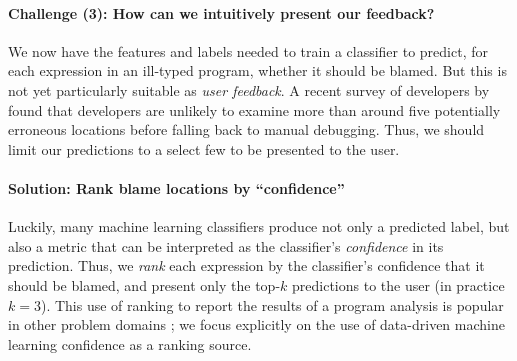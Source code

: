 \paragraph{\textbf{Challenge (3): How can we intuitively present our feedback?}}
We now have the features and labels needed to train a classifier to
predict, for each expression in an ill-typed program, whether it should
be blamed.
%
But this is not yet particularly suitable as \emph{user feedback}.
%
A recent survey of developers by \citet{Kochhar2016-oc} found that
developers are unlikely to examine more than around five potentially
erroneous locations before falling back to manual debugging.
%
Thus, we should limit our predictions to a select few to be presented to
the user.

\paragraph{\textbf{Solution: Rank blame locations by ``confidence''}}
Luckily, many machine learning classifiers produce not only a predicted
label, but also a metric that can be interpreted as the classifier's
\emph{confidence} in its prediction.
%
Thus, we \emph{rank} each expression by the classifier's confidence that
it should be blamed, and present only the top-$k$ predictions to the
user (in practice $k=3$). This use of ranking to report
the results of a program analysis is popular in other problem domains
\citep[see, \eg][]{Kremenek2003-ck}; we focus
explicitly on the use of data-driven machine learning confidence as a
ranking source.



